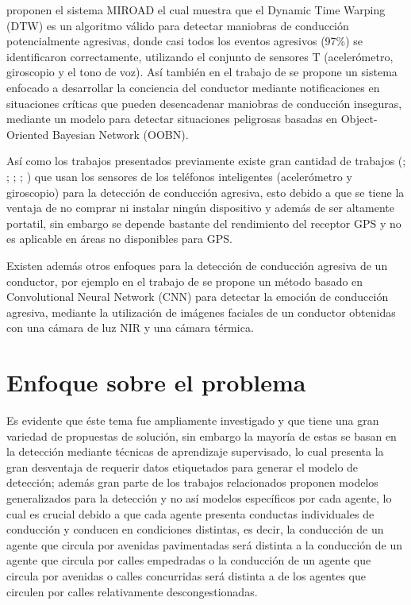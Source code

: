 \vspace{5mm} %

 proponen el sistema MIROAD el cual muestra que el Dynamic Time Warping (DTW) es un algoritmo válido para detectar maniobras de conducción potencialmente agresivas, donde casi todos los eventos agresivos (97\%) se identificaron correctamente, utilizando el conjunto de sensores T (aceler\'{o}metro, giroscopio y el tono de voz). As\'{i} tambi\'{e}n en el trabajo de  se propone un sistema enfocado a desarrollar la conciencia del conductor mediante notificaciones en situaciones críticas que pueden desencadenar maniobras de conducci\'{o}n inseguras, mediante un modelo para detectar situaciones peligrosas basadas en Object-Oriented Bayesian Network (OOBN).

\vspace{5mm} %

As\'{i} como los trabajos presentados previamente existe gran cantidad de trabajos (; ; ; ; ) que usan los sensores de los tel\'{e}fonos inteligentes (aceler\'{o}metro y giroscopio) para la detecci\'{o}n de conducci\'{o}n agresiva, esto debido a que se tiene la ventaja de no comprar ni instalar ning\'{u}n dispositivo y adem\'{a}s de ser altamente portatil, sin embargo se depende bastante del rendimiento del receptor GPS y no es aplicable en \'{a}reas no disponibles para GPS.

\vspace{5mm} %

Existen adem\'{a}s otros enfoques para la detecci\'{o}n de conducci\'{o}n agresiva de un conductor, por ejemplo en el trabajo de  se propone un método basado en Convolutional Neural Network (CNN) para detectar la emoción de conducción agresiva, mediante la utilizaci\'{o}n de imágenes faciales de un conductor obtenidas con una cámara de luz NIR y una cámara térmica.

\section{Enfoque sobre el problema}

Es evidente que \'{e}ste tema fue ampliamente investigado y que tiene una gran variedad de propuestas de soluci\'{o}n, sin embargo la mayor\'{i}a de estas se basan en la detecci\'{o}n mediante t\'{e}cnicas de aprendizaje supervisado, lo cual presenta la gran desventaja de requerir datos etiquetados para generar el modelo de detecci\'{o}n; adem\'{a}s gran parte de los trabajos relacionados proponen modelos generalizados para la detecci\'{o}n y no as\'{i} modelos espec\'{i}ficos por cada agente, lo cual es crucial debido a que cada agente presenta conductas individuales de conducci\'{o}n y conducen en condiciones distintas, es decir, la conducci\'{o}n de un agente que circula por avenidas pavimentadas ser\'{a} distinta a la conducci\'{o}n de un agente que circula por calles empedradas o la conducci\'{o}n de un agente que circula por avenidas o calles concurridas ser\'{a} distinta a de los agentes que circulen por calles relativamente descongestionadas.

